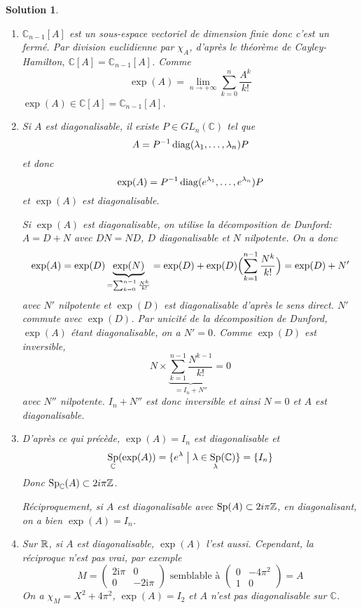 \documentclass[12pt]{article}
\newtheorem{solution}{Solution}[section]
\theoremstyle{remark}
\newcommand{\C}{\mathbb{C}} \newcommand{\Q}{\mathbb{Q}}
\DeclareMathOperator{\Sp}{Sp} \DeclareMathOperator{\mat}{mat}
\begin{document}
\begin{solution}
	\phantom{}
	\begin{enumerate}
		\item $\C_{n-1}[A]$ est un sous-espace vectoriel de dimension finie donc c'est un fermé. Par division euclidienne par $\chi_{A}$, d'après le théorème de Cayley-Hamilton, $\C[A]=\C_{n-1}[A]$. Comme 
		$$\exp(A)=\lim\limits_{n\to+\infty}\sum_{k=0}^{n}\frac{A^{k}}{k!}$$
		$\exp(A)\in \C[A]=\C_{n-1}[A]$.

		\item Si $A$ est diagonalisable, il existe $P\in GL_{n}(\C)$ tel que 
		$$A=P^{-1}\operatorname{diag}(\lambda_{1},\dots,\lambda_{n})P$$
		et donc 
		$$\exp(A)=P^{-1}\operatorname{diag}(e^{\lambda_{1}},\dots,e^{\lambda_{n}})P$$
		et $\exp(A)$ est diagonalisable.

		Si $\exp(A)$ est diagonalisable, on utilise la décomposition de Dunford: $A=D+N$ avec $DN=ND$, $D$ diagonalisable et $N$ nilpotente. On a donc 
		$$\exp(A)=\exp(D)\underbrace{\exp(N)}_{=\sum_{k=0}^{n-1}\frac{N^{k}}{k!}}=\exp(D)+\exp(D)\Bigl(\sum_{k=1}^{n-1}\frac{N^{k}}{k!}\Bigr)=\exp(D)+N'$$
		avec $N'$ nilpotente et $\exp(D)$ est diagonalisable d'après le sens direct. $N'$ commute avec $\exp(D)$. Par unicité de la décomposition de Dunford, $\exp(A)$ étant diagonalisable, on a $N'=0$. Comme $\exp(D)$ est inversible, 
		$$N\times\underbrace{\sum_{k=1}^{n-1}\frac{N^{k-1}}{k!}}_{=I_{n}+N''}=0$$
		avec $N''$ nilpotente. $I_{n}+N''$ est donc inversible et ainsi $N=0$ et $A$ est diagonalisable.

		\item D'après ce qui précède, $\exp(A)=I_{n}$ est diagonalisable et 
		$$\Sp_{\C}(\exp(A))=\{e^{\lambda}\bigm|\lambda\in\Sp_{\lambda}(\C)\}=\{I_{n}\}$$
		Donc $\Sp_{\C}(A)\subset 2i\pi\Z$.

		Réciproquement, si $A$ est diagonalisable avec $\Sp(A)\subset 2i\pi\Z$, en diagonalisant, on a bien $\exp(A)=I_{n}$.

		\item Sur $\mathbb{R}$, si $A$ est diagonalisable, $\exp(A)$ l'est aussi. Cependant, la réciproque n'est pas vrai, par exemple
		$$M=\begin{pmatrix}
			2\mathrm{i}\pi & 0\\
			0 & -2\mathrm{i}\pi
		\end{pmatrix}\text{  semblable à }
		\begin{pmatrix}
			0 & -4\pi^{2}\\
			1 & 0
		\end{pmatrix}=A$$
		On a $\chi_{M}=X^{2}+4\pi^{2}$, $\exp(A)=I_{2}$ et $A$ n'est pas diagonalisable sur $\C$.
	\end{enumerate}
\end{solution}
\end{document}
